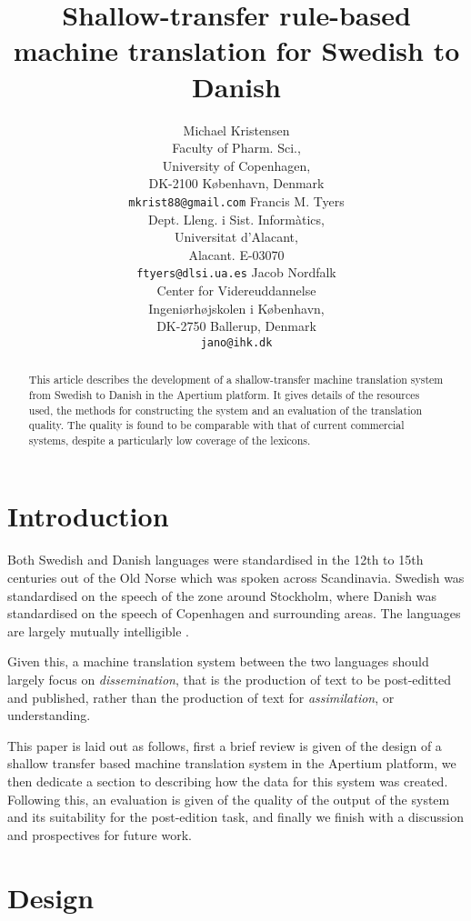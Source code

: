 \documentclass[11pt]{article}
\title{Shallow-transfer rule-based machine translation for Swedish to Danish}
\author{Michael Kristensen\\
  Faculty of Pharm. Sci., \\
  University of Copenhagen,\\
  DK-2100 København, Denmark \\
  {\tt mkrist88@gmail.com} \And
  Francis M. Tyers\\
  Dept. Lleng. i Sist. Informàtics, \\
  Universitat d'Alacant,\\
  Alacant. E-03070\\  
  {\tt ftyers@dlsi.ua.es} \And
  Jacob Nordfalk\\
  Center for Videreuddannelse\\
  Ingeniørhøjskolen i København,\\
  DK-2750 Ballerup, Denmark\\
  {\tt jano@ihk.dk}}
\date{}
\begin{document}
\maketitle

\begin{abstract}
  This article describes the development of a shallow-transfer machine translation
  system from Swedish to Danish in the Apertium platform. It gives details of the 
  resources used, the methods for constructing the system and an evaluation of the 
  translation quality. The quality is found to be comparable with that of current
  commercial systems, despite a particularly low coverage of the lexicons.
\end{abstract}

\section{Introduction}

Both Swedish and Danish languages were standardised in the 12th to 15th centuries out
of the Old Norse which was spoken across Scandinavia. Swedish was standardised on the 
speech of the zone around Stockholm, where Danish was standardised on the speech of 
Copenhagen and surrounding areas. The languages are largely mutually intelligible \citep{Haugen1990}.

Given this, a machine translation system between the two languages should largely
focus on \emph{dissemination}, that is the production of text to be post-editted and 
published, rather than the production of text for \emph{assimilation}, or understanding.

This paper is laid out as follows, first a brief review is given of the design of a 
shallow transfer based machine translation system in the Apertium platform, we then 
dedicate a section to describing how the data for this system was created. Following this, 
an evaluation is given of the quality of the output of the system and its suitability 
for the post-edition task, and finally we finish with a discussion and prospectives 
for future work.


\section{Design}
\end{document}
